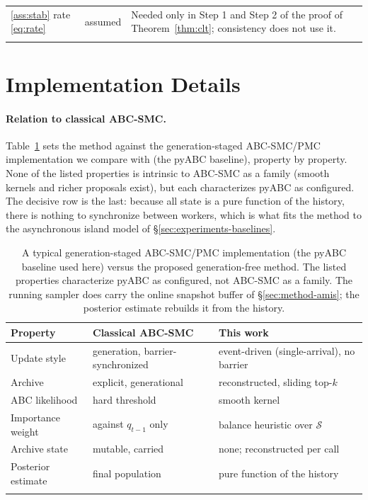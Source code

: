 \documentclass[pdflatex,sn-mathphys-num]{sn-jnl}
\theoremstyle{plain}
\theoremstyle{definition}
\begin{document}
\begin{appendices}
\begin{table}[h]
\begin{tabular}{@{}p{}p{}p{}@{}}
\ref{ass:stab} rate \eqref{eq:rate} & assumed & Needed only in Step 1 and Step 2 of the proof of Theorem~\ref{thm:clt}; consistency does not use it. \\
\botrule
\end{tabular}
\end{table}

\section{Implementation Details}\label{app:implementation}

\paragraph{Relation to classical ABC-SMC.}\label{sec:method-comparison}
Table~\ref{tab:method-comparison} sets the method against the generation-staged ABC-SMC/PMC implementation we compare with (the pyABC baseline), property by property. None of the listed properties is intrinsic to ABC-SMC as a family (smooth kernels and richer proposals exist), but each characterizes pyABC as configured. The decisive row is the last: because all state is a pure function of the history, there is nothing to synchronize between workers, which is what fits the method to the asynchronous island model of \S\ref{sec:experiments-baselines}.
\begin{table}[h]
\caption{A typical generation-staged ABC-SMC/PMC implementation (the pyABC baseline used here) versus the proposed generation-free method. The listed properties characterize pyABC as configured, not ABC-SMC as a family. The running sampler does carry the online snapshot buffer of \S\ref{sec:method-amis}; the posterior estimate rebuilds it from the history.}\label{tab:method-comparison}
\centering
\begin{tabular}{@{}lll@{}}
\toprule
Property & Classical ABC-SMC & This work \\
\midrule
Update style & generation, barrier-synchronized & event-driven (single-arrival), no barrier \\
Archive & explicit, generational & reconstructed, sliding top-$k$ \\
ABC likelihood & hard threshold & smooth kernel \\
Importance weight & against $q_{t-1}$ only & balance heuristic over $\mathcal{S}$ \\
Archive state & mutable, carried & none; reconstructed per call \\
Posterior estimate & final population & pure function of the history \\
\botrule
\end{tabular}
\end{table}



\end{appendices}
\end{document}
